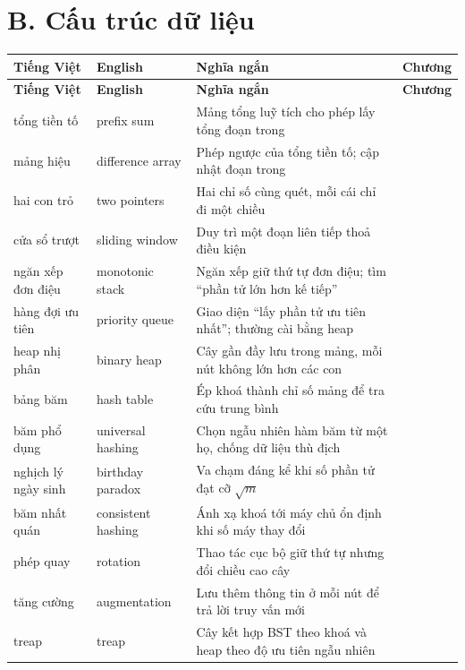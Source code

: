 \documentclass[algorithm.tex]{subfiles}
\begin{document}
\section*{B. Cấu trúc dữ liệu}
\begin{center}\footnotesize
{}
\begin{longtable}{@{}L{3.5cm}L{3.9cm}L{6.2cm}L{1.5cm}@{}}
\toprule
\textbf{Tiếng Việt} & \textbf{English} & \textbf{Nghĩa ngắn} & \textbf{Chương}\\
\midrule
\endfirsthead
\toprule
\textbf{Tiếng Việt} & \textbf{English} & \textbf{Nghĩa ngắn} & \textbf{Chương}\\
\midrule
\endhead
tổng tiền tố & prefix sum & Mảng tổng luỹ tích cho phép lấy tổng đoạn trong  & \\
mảng hiệu & difference array & Phép ngược của tổng tiền tố; cập nhật đoạn trong  & \\
hai con trỏ & two pointers & Hai chỉ số cùng quét, mỗi cái chỉ đi một chiều & \\
cửa sổ trượt & sliding window & Duy trì một đoạn liên tiếp thoả điều kiện & \\
ngăn xếp đơn điệu & monotonic stack & Ngăn xếp giữ thứ tự đơn điệu; tìm ``phần tử lớn hơn kế tiếp'' & \\
hàng đợi ưu tiên & priority queue & Giao diện ``lấy phần tử ưu tiên nhất''; thường cài bằng heap & \\
heap nhị phân & binary heap & Cây gần đầy lưu trong mảng, mỗi nút không lớn hơn các con & \\
bảng băm & hash table & Ép khoá thành chỉ số mảng để tra cứu  trung bình & \\
băm phổ dụng & universal hashing & Chọn ngẫu nhiên hàm băm từ một họ, chống dữ liệu thù địch & \\
nghịch lý ngày sinh & birthday paradox & Va chạm đáng kể khi số phần tử đạt cỡ \(\sqrt{m}\) & \\
băm nhất quán & consistent hashing & Ánh xạ khoá tới máy chủ ổn định khi số máy thay đổi & \\
phép quay & rotation & Thao tác cục bộ giữ thứ tự nhưng đổi chiều cao cây & \\
tăng cường & augmentation & Lưu thêm thông tin ở mỗi nút để trả lời truy vấn mới & \\
treap & treap & Cây kết hợp BST theo khoá và heap theo độ ưu tiên ngẫu nhiên & \\

\end{longtable}
\end{center}
\end{document}
